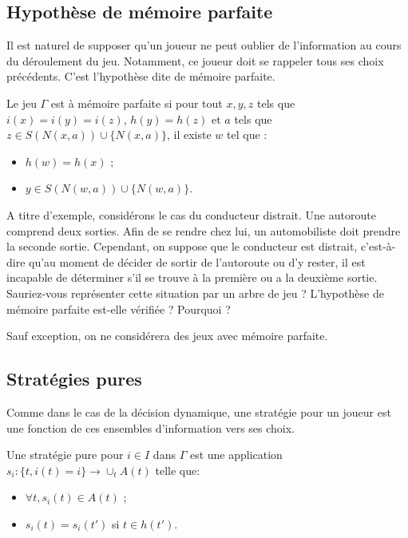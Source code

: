 \subsection{Hypothèse de mémoire parfaite}

Il est naturel de supposer qu'un joueur ne peut oublier de
l'information au cours du déroulement du jeu. Notamment, ce joueur
doit se rappeler tous ses choix précédents. C'est l'hypothèse dite
de mémoire parfaite.

\begin{definition}
Le jeu $\Gamma$ est à mémoire parfaite si pour tout $x, y, z$ tels
que $i(x)=i(y)=i(z)$, $h(y)=h(z)$ et $a$ tels que $z\in
S(N(x,a))\cup\{N(x,a)\}$, il existe $w$ tel que :
\begin{itemize}
\item $h(w)=h(x)$ ;
\item $y\in S(N(w,a))\cup\{N(w,a)\}$.
\end{itemize}
\end{definition}

A titre d'exemple, considérons le cas du conducteur distrait. Une
autoroute comprend deux sorties. Afin de se rendre chez lui, un
automobiliste doit prendre la seconde sortie. Cependant, on
suppose que le conducteur est distrait, c'est-à-dire qu'au moment
de décider de sortir de l'autoroute ou d'y rester, il est
incapable de déterminer s'il se trouve à la première ou a la
deuxième sortie. Sauriez-vous représenter cette situation par un
arbre de jeu ? L'hypothèse de mémoire parfaite est-elle vérifiée ?
Pourquoi ?

Sauf exception, on ne considérera des jeux avec mémoire parfaite. %

\subsection{Stratégies pures}
Comme dans le cas de la décision dynamique, une stratégie pour un
joueur est une fonction de ces ensembles d'information vers ses
choix.

\begin{definition}
 Une stratégie pure pour $i\in I$ dans $\Gamma$ est une
application $s_i\colon \{t,i(t)=i\}\to\cup_{t}A(t)$ telle que:
\begin{itemize}
\item $\forall t, s_i(t)\in A(t)$ ;
\item $s_i(t) = s_i(t')$ si $t\in h(t')$.
\end{itemize}
\end{definition}

